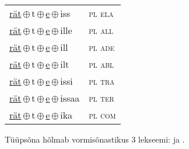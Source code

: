 \begin{minipage}{\textwidth}
\begin{sideways}
\begin{tabular}{l l}
\underline{rät}\,$\oplus$\,t\,$\oplus$\,\underline{e}\,$\oplus$\,iss & \textsc{ pl ela } \\
\underline{rät}\,$\oplus$\,t\,$\oplus$\,\underline{e}\,$\oplus$\,ille & \textsc{ pl all } \\
\underline{rät}\,$\oplus$\,t\,$\oplus$\,\underline{e}\,$\oplus$\,ill & \textsc{ pl ade } \\
\underline{rät}\,$\oplus$\,t\,$\oplus$\,\underline{e}\,$\oplus$\,ilt & \textsc{ pl abl } \\
\underline{rät}\,$\oplus$\,t\,$\oplus$\,\underline{e}\,$\oplus$\,issi & \textsc{ pl tra } \\
\underline{rät}\,$\oplus$\,t\,$\oplus$\,\underline{e}\,$\oplus$\,issaa & \textsc{ pl ter } \\
\underline{rät}\,$\oplus$\,t\,$\oplus$\,\underline{e}\,$\oplus$\,ika & \textsc{ pl com } \\
\end{tabular}
\end{sideways}
\label{tab:tüüpsõnamall-rätte}

\end{minipage}

 
\vspace{1em}
\noindent Tüüpsõna hõlmab vormisõnastikus 3 lekseemi:  ja .
